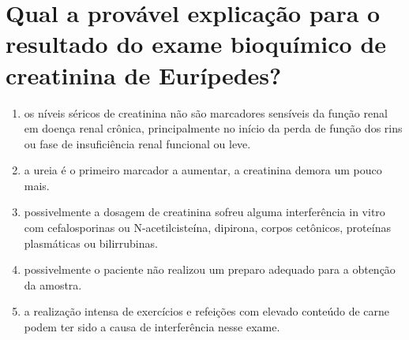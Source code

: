 \documentclass[11pt,notitlepage]{article}
\begin{document}
\section{Qual a provável explicação para o resultado do exame bioquímico de creatinina de Eurípedes?}
\begin{multicols}{2}
	\setlength{\columnseprule}{0pt}
	\begin{enumerate}[label=(\alph*)]
		\item os níveis séricos de creatinina não são marcadores sensíveis da função renal em doença renal crônica, principalmente no início da perda de função dos rins ou fase de insuficiência renal funcional ou leve.
		\item a ureia é o primeiro marcador a aumentar, a creatinina demora um pouco mais.
		\item possivelmente a dosagem de creatinina sofreu alguma interferência in vitro com cefalosporinas ou N-acetilcisteína, dipirona, corpos cetônicos, proteínas plasmáticas ou bilirrubinas. 
		\item possivelmente o paciente não realizou um preparo adequado para a obtenção da amostra.
		\item a realização intensa de exercícios e refeições com elevado conteúdo de carne podem ter sido a causa de interferência nesse exame.
	\end{enumerate}
\end{multicols}
\vspace{0.5cm}
\end{document}
